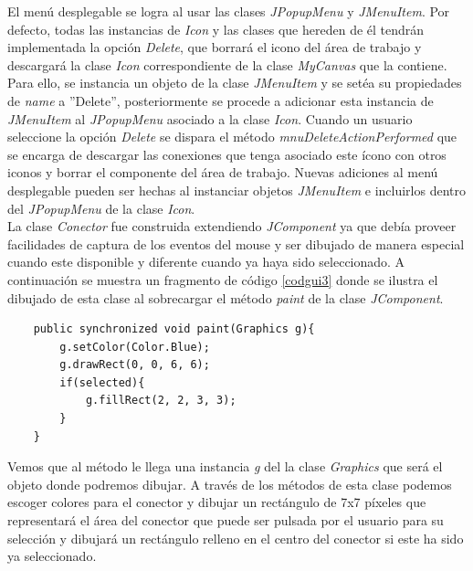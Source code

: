 El men\'u desplegable se logra al usar las clases \textit{JPopupMenu}  y \textit{JMenuItem}.  Por defecto, todas
las instancias de \textit{Icon} y las clases que hereden de \'el tendr\'an implementada la opci\'on
\textit{Delete}, que borrar\'a el icono del \'area de trabajo y descargar\'a la clase \textit{Icon}
correspondiente de la clase \textit{MyCanvas} que la contiene.  Para ello, se instancia un objeto de la clase
\textit{JMenuItem} y se set\'ea su propiedades de \textit{name} a ''Delete'', posteriormente se procede a
adicionar esta instancia de \textit{JMenuItem} al \textit{JPopupMenu} asociado a la clase \textit{Icon}.  Cuando
un usuario seleccione la opci\'on \textit{Delete} se dispara el m\'etodo \textit{mnuDeleteActionPerformed} que se
encarga de descargar las conexiones que tenga asociado este \'icono con otros iconos y borrar el componente del
\'area de trabajo.  Nuevas adiciones al men\'u desplegable pueden ser hechas al instanciar objetos
\textit{JMenuItem} e incluirlos dentro del \textit{JPopupMenu} de la clase \textit{Icon}.\\

La clase \textit{Conector} fue construida extendiendo \textit{JComponent} ya que deb\'ia proveer facilidades de
captura de los eventos del mouse y ser dibujado de manera especial cuando este disponible y diferente cuando ya
haya sido seleccionado.  A continuaci\'on se muestra un fragmento de c\'odigo \ref{codgui3} donde se ilustra el
dibujado de esta clase al sobrecargar el m\'etodo \textit{paint} de la clase \textit{JComponent}.

\begin{codigof}[h]
\begin{verbatim}
    public synchronized void paint(Graphics g){
        g.setColor(Color.Blue);
        g.drawRect(0, 0, 6, 6);
        if(selected){
            g.fillRect(2, 2, 3, 3);
        }
    }
\end{verbatim}
\caption{Dibujado de la clase conector}
\label{codgui3}
\end{codigof}

Vemos que al m\'etodo le llega una instancia \textit{g} del la clase \textit{Graphics} que ser\'a el objeto donde
podremos dibujar.  A trav\'es de los m\'etodos de esta clase podemos escoger colores para el conector y dibujar un
rect\'angulo de 7x7 p\'ixeles que representar\'a el \'area del conector que puede ser pulsada por el usuario para
su selecci\'on y dibujar\'a un rect\'angulo relleno en el centro del conector si este ha sido ya seleccionado.\\

